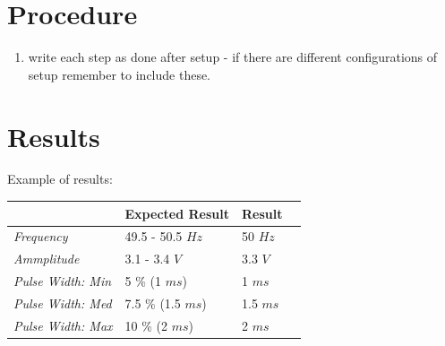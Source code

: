 \section*{Procedure}

\begin{enumerate}
\item write each step as done after setup - if there are different configurations of setup remember to include these.
\end{enumerate}

\section*{Results}

Example of results:
\begin{table}[H]
\begin{tabular}{|l|l|l|l|}

\hline%
           & \textbf{Expected Result}   & \textbf{Result} \\
\hline%
  \textit{Frequency}           &  49.5 - 50.5 $Hz$ &  50 $Hz$  \\
\hline%
\textit{Ammplitude}                     &   3.1 - 3.4 $V$            &    3.3 $V$          \\
\hline%
 \textit{Pulse Width: Min}     &    5 \% (1 $ms$)          &     1  $ms$   \\
\hline%
\textit{Pulse Width: Med}      &      7.5 \% (1.5 $ms$)           & 1.5 $ms$            \\
\hline%
  \textit{Pulse Width: Max}   &    10 \% (2 $ms$)             &  2 $ms$         \\
\hline%

\end{tabular}
\end{table}